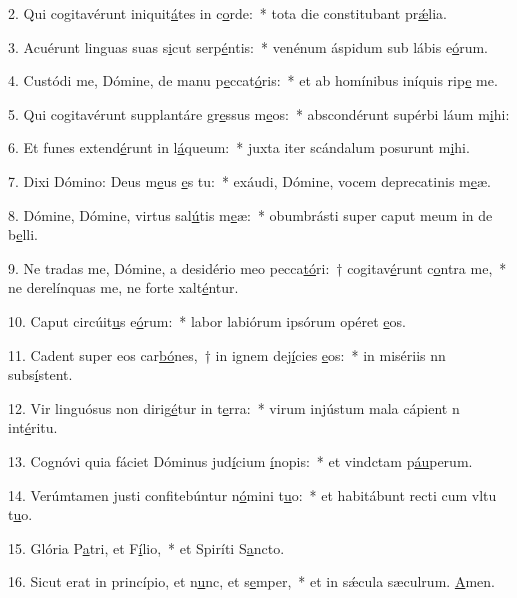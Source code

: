 2. Qui cogitavérunt iniquit\uline{á}tes in c\uline{o}rde:~* tota die constitubant pr\uline{ǽ}lia.\par 
3. Acuérunt linguas suas s\uline{i}cut serp\uline{é}ntis:~* venénum áspidum sub lábis e\uline{ó}rum.\par 
4. Custódi me, Dómine, de manu p\uline{e}ccat\uline{ó}ris:~* et ab homínibus iníquis rip\uline{e} me.\par 
5. Qui cogitavérunt supplantáre gr\uline{e}ssus m\uline{e}os:~* abscondérunt supérbi láum m\uline{i}hi:\par 
6. Et funes extend\uline{é}runt in l\uline{á}queum:~* juxta iter scándalum posurunt m\uline{i}hi.\par 
7. Dixi Dómino: Deus m\uline{e}us \uline{e}s tu:~* exáudi, Dómine, vocem deprecatinis m\uline{e}æ.\par 
8. Dómine, Dómine, virtus sal\uline{ú}tis m\uline{e}æ:~* obumbrásti super caput meum in de b\uline{e}lli.\par 
9. Ne tradas me, Dómine, a desidério meo pecca\uline{tó}ri:~† cogitav\uline{é}runt c\uline{o}ntra me,~* ne derelínquas me, ne forte xalt\uline{é}ntur.\par 
10. Caput circúit\uline{u}s e\uline{ó}rum:~* labor labiórum ipsórum opéret \uline{e}os.\par 
11. Cadent super eos car\uline{bó}nes,~† in ignem dej\uline{í}cies \uline{e}os:~* in misériis nn subs\uline{í}stent.\par 
12. Vir linguósus non dirig\uline{é}tur in t\uline{e}rra:~* virum injústum mala cápient n int\uline{é}ritu.\par 
13. Cognóvi quia fáciet Dóminus jud\uline{í}cium \uline{í}nopis:~* et vindctam p\uline{áu}perum.\par 
14. Verúmtamen justi confitebúntur n\uline{ó}mini t\uline{u}o:~* et habitábunt recti cum vltu t\uline{u}o.\par 
15. Glória P\uline{a}tri, et F\uline{í}lio,~* et Spiríti S\uline{a}ncto.\par 
16. Sicut erat in princípio, et n\uline{u}nc, et s\uline{e}mper,~* et in sǽcula sæculrum. \uline{A}men.\par 
